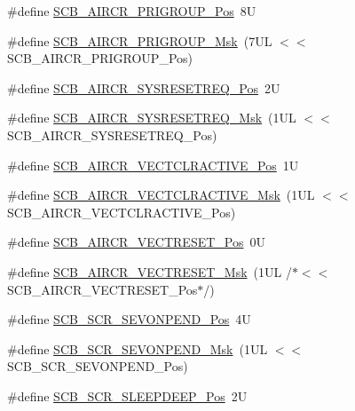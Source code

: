 \begin{DoxyCompactItemize}
\item 
\#define \hyperlink{group___c_m_s_i_s___s_c_b_gaca155deccdeca0f2c76b8100d24196c8}{S\-C\-B\-\_\-\-A\-I\-R\-C\-R\-\_\-\-P\-R\-I\-G\-R\-O\-U\-P\-\_\-\-Pos}~8\-U
\item 
\#define \hyperlink{group___c_m_s_i_s___s_c_b_ga8be60fff03f48d0d345868060dc6dae7}{S\-C\-B\-\_\-\-A\-I\-R\-C\-R\-\_\-\-P\-R\-I\-G\-R\-O\-U\-P\-\_\-\-Msk}~(7\-U\-L $<$$<$ S\-C\-B\-\_\-\-A\-I\-R\-C\-R\-\_\-\-P\-R\-I\-G\-R\-O\-U\-P\-\_\-\-Pos)
\item 
\#define \hyperlink{group___c_m_s_i_s___s_c_b_gaffb2737eca1eac0fc1c282a76a40953c}{S\-C\-B\-\_\-\-A\-I\-R\-C\-R\-\_\-\-S\-Y\-S\-R\-E\-S\-E\-T\-R\-E\-Q\-\_\-\-Pos}~2\-U
\item 
\#define \hyperlink{group___c_m_s_i_s___s_c_b_gaae1181119559a5bd36e62afa373fa720}{S\-C\-B\-\_\-\-A\-I\-R\-C\-R\-\_\-\-S\-Y\-S\-R\-E\-S\-E\-T\-R\-E\-Q\-\_\-\-Msk}~(1\-U\-L $<$$<$ S\-C\-B\-\_\-\-A\-I\-R\-C\-R\-\_\-\-S\-Y\-S\-R\-E\-S\-E\-T\-R\-E\-Q\-\_\-\-Pos)
\item 
\#define \hyperlink{group___c_m_s_i_s___s_c_b_gaa30a12e892bb696e61626d71359a9029}{S\-C\-B\-\_\-\-A\-I\-R\-C\-R\-\_\-\-V\-E\-C\-T\-C\-L\-R\-A\-C\-T\-I\-V\-E\-\_\-\-Pos}~1\-U
\item 
\#define \hyperlink{group___c_m_s_i_s___s_c_b_ga212c5ab1c1c82c807d30d2307aa8d218}{S\-C\-B\-\_\-\-A\-I\-R\-C\-R\-\_\-\-V\-E\-C\-T\-C\-L\-R\-A\-C\-T\-I\-V\-E\-\_\-\-Msk}~(1\-U\-L $<$$<$ S\-C\-B\-\_\-\-A\-I\-R\-C\-R\-\_\-\-V\-E\-C\-T\-C\-L\-R\-A\-C\-T\-I\-V\-E\-\_\-\-Pos)
\item 
\#define \hyperlink{group___c_m_s_i_s___s_c_b_ga0d483d9569cd9d1b46ec0d171b1f18d8}{S\-C\-B\-\_\-\-A\-I\-R\-C\-R\-\_\-\-V\-E\-C\-T\-R\-E\-S\-E\-T\-\_\-\-Pos}~0\-U
\item 
\#define \hyperlink{group___c_m_s_i_s___s_c_b_ga3006e31968bb9725e7b4ee0784d99f7f}{S\-C\-B\-\_\-\-A\-I\-R\-C\-R\-\_\-\-V\-E\-C\-T\-R\-E\-S\-E\-T\-\_\-\-Msk}~(1\-U\-L /$\ast$$<$$<$ S\-C\-B\-\_\-\-A\-I\-R\-C\-R\-\_\-\-V\-E\-C\-T\-R\-E\-S\-E\-T\-\_\-\-Pos$\ast$/)
\item 
\#define \hyperlink{group___c_m_s_i_s___s_c_b_ga3bddcec40aeaf3d3a998446100fa0e44}{S\-C\-B\-\_\-\-S\-C\-R\-\_\-\-S\-E\-V\-O\-N\-P\-E\-N\-D\-\_\-\-Pos}~4\-U
\item 
\#define \hyperlink{group___c_m_s_i_s___s_c_b_gafb98656644a14342e467505f69a997c9}{S\-C\-B\-\_\-\-S\-C\-R\-\_\-\-S\-E\-V\-O\-N\-P\-E\-N\-D\-\_\-\-Msk}~(1\-U\-L $<$$<$ S\-C\-B\-\_\-\-S\-C\-R\-\_\-\-S\-E\-V\-O\-N\-P\-E\-N\-D\-\_\-\-Pos)
\item 
\#define \hyperlink{group___c_m_s_i_s___s_c_b_gab304f6258ec03bd9a6e7a360515c3cfe}{S\-C\-B\-\_\-\-S\-C\-R\-\_\-\-S\-L\-E\-E\-P\-D\-E\-E\-P\-\_\-\-Pos}~2\-U

\end{DoxyCompactItemize}
